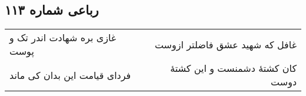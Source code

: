 \begin{center}
\section*{رباعی شماره ۱۱۳}
\label{sec:sh113}
\begin{longtable}{l p{0.5cm} r}
غازی بره شهادت اندر تک و پوست
&&
غافل که شهید عشق فاضلتر ازوست
\\
فردای قیامت این بدان کی ماند
&&
کان کشتهٔ دشمنست و این کشتهٔ دوست
\\
\end{longtable}
\end{center}

